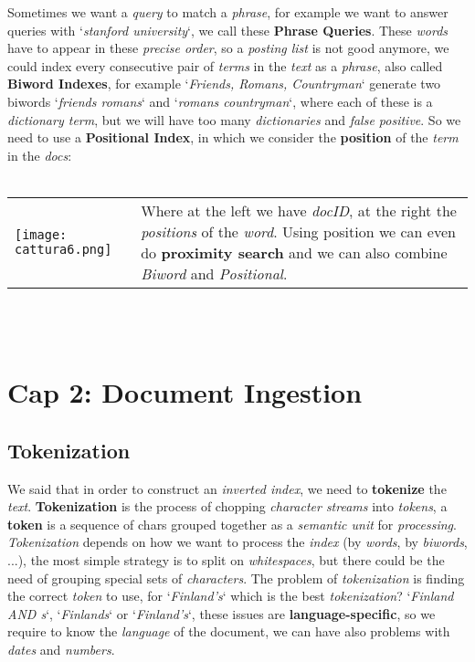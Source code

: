 \documentclass{article}
\begin{document}
Sometimes we want a \emph{query} to match a \emph{phrase}, for example we want to answer queries with `\emph{stanford university}`, we call these  \textbf{Phrase Queries}. These \emph{words} have to appear in these \emph{precise order}, so a \emph{posting list} is not good anymore, we could index every consecutive pair of \emph{terms} in the \emph{text} as a \emph{phrase}, also called \textbf{Biword Indexes}, for example `\emph{Friends, Romans, Countryman}` generate two biwords `\emph{friends romans}` and `\emph{romans countryman}`, where each of these is a \emph{dictionary term}, but we will have too many \emph{dictionaries} and \emph{false positive}. So we need to use a \textbf{Positional Index}, in which we consider the \textbf{position} of the \emph{term} in the \emph{docs}:\\\\
\begin{tabular}{C{7cm}  L{6.5cm}}
        \texttt{[image: cattura6.png]} & 
	Where at the left we have \emph{docID}, at the right the \emph{positions} of the \emph{word}. Using position we can even do \textbf{proximity search} and we can also combine \emph{Biword} and \emph{Positional}.
\end{tabular}\\\\
\section{Cap 2: Document Ingestion}
\subsection{Tokenization}
We said that in order to construct an \emph{inverted index}, we need to \textbf{tokenize} the \emph{text}. \textbf{Tokenization} is the process of chopping \emph{character streams} into \emph{tokens}, a \textbf{token} is a sequence of chars grouped together as a \emph{semantic unit} for \emph{processing}. \emph{Tokenization} depends on how we want to process the \emph{index} (by \emph{words}, by \emph{biwords}, ...), the most simple strategy is to split on \emph{whitespaces}, but there could be the need of grouping special sets of \emph{characters}. The problem of \emph{tokenization} is finding the correct \emph{token} to use, for `\emph{Finland's}` which is the best \emph{tokenization}? `\emph{Finland AND s}`, `\emph{Finlands}` or `\emph{Finland's}`, these issues are \textbf{language-specific}, so we require to know the \emph{language} of the document, we can have also problems with \emph{dates} and \emph{numbers}. 
\end{document}
